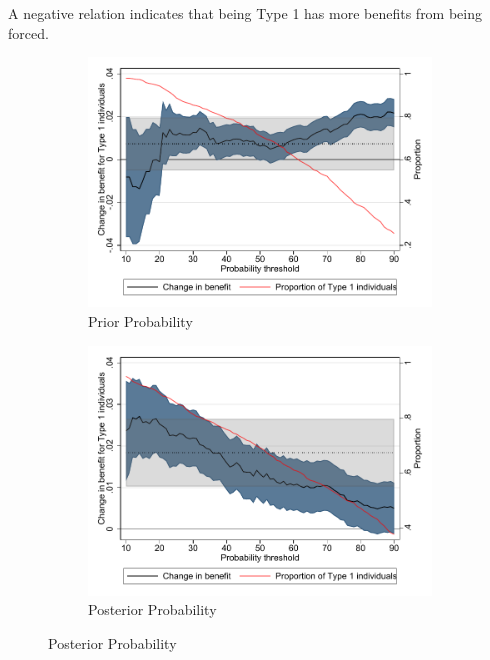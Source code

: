 \documentclass[oneside,11pt]{article}
\begin{document}
\begin{figure}[H]
\begin{center}
\begin{subfigure}{0.475\textwidth}
    \end{subfigure}
  
    \end{center}
     \scriptsize 
\end{figure}

A negative relation indicates that being Type 1 has more benefits from being forced.


\begin{figure}[H]
    \caption{Type 1 class vs HTE}
    \label{}
    \begin{center}
    \begin{subfigure}{0.475\textwidth}
        \caption{Prior Probability}
        \centering
        \includegraphics[width=\textwidth]{Figuras/benefit_type1.pdf}
    \end{subfigure}
    \begin{subfigure}{0.475\textwidth}
        \caption{Posterior Probability}
        \centering
        \includegraphics[width=\textwidth]{Figuras/benefit_type1p.pdf}
    \end{subfigure}
  
    \end{center}
     \scriptsize 
\end{figure}
\end{document}
